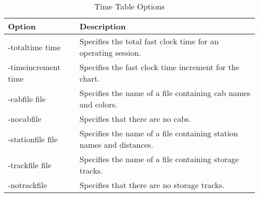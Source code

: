 \begin{table}
\begin{centering}
\begin{tabular}{|l|p{3in}|}
\hline
Option &Description \\
\hline
\hline
-totaltime time & Specifies the total fast clock time for an operating session.\\
-timeincrement time & Specifies the fast clock time increment for the chart.\\
-cabfile file & Specifies the name of a file containing cab names and colors.\\
-nocabfile & Specifies that there are no cabs.\\
-stationfile file & Specifies the name of a file containing station
names and distances.\\
-trackfile file & Specifies the name of a file containing storage tracks.\\
-notrackfile & Specifies that there are no storage tracks.\\
\hline
\end{tabular}
\caption{Time Table Options}
\label{tab:cli}
\end{centering}
\end{table}

